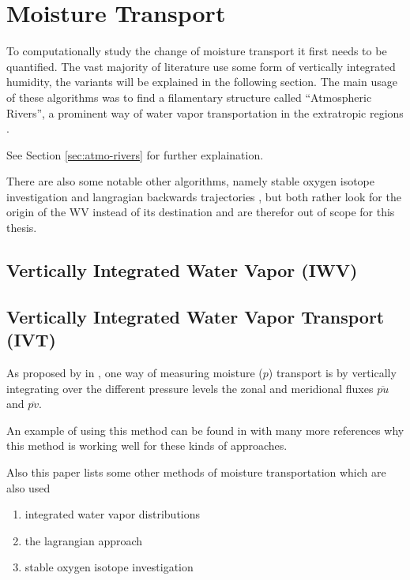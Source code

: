 \section{Moisture Transport}

To computationally study the change of moisture transport it first needs to be quantified. 
The vast majority of literature use some form of vertically integrated humidity, the variants will be explained in the following section.  
The main usage of these algorithms was to find a filamentary structure called \enquote{Atmospheric Rivers}, a prominent way of water vapor transportation in the extratropic regions \cite{gimeno_atmospheric_2014}. 

See Section \ref{sec:atmo-rivers} for further explaination. 


There are also some notable other algorithms, namely stable oxygen isotope investigation \cite{ma_atmospheric_nodate} and langragian backwards trajectories \cite{zhao_lagrangian_2021}, but both rather look for the origin of the WV instead of its destination and are therefor out of scope for this thesis.

\subsection{Vertically Integrated Water Vapor (IWV)}

\subsection{Vertically Integrated Water Vapor Transport (IVT)}

As proposed by \citeauthor{zhu_proposed_1998} in \cite{zhu_proposed_1998}, one way of measuring moisture ($p$) transport is by vertically integrating over the different pressure levels the zonal and meridional fluxes $\overline{pu}$ and $\overline{pv}$. 

An example of using this method can be found in \cite{ayantobo_integrated_2022} with many more references why this method is working well for these kinds of approaches. 

Also this paper lists some other methods of moisture transportation which are also used

\begin{enumerate}
  \item integrated water vapor distributions
  \item the lagrangian approach
  \item stable oxygen isotope investigation
\end{enumerate}

